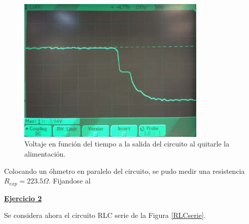 \documentclass[a4paper]{article}
\begin{document}
\begin{figure}[H]
	\centering
	\includegraphics[width=0.8\textwidth]{Descarga-transitoria.jpeg}
	\caption{Voltaje en función del tiempo a la salida del circuito al quitarle la alimentación.}
\end{figure}






Colocando un óhmetro en paralelo del circuito, se pudo medir una resistencia $R_{exp}=223.5\Omega$.
Fijandose al







\newpage

\textbf{\underline{Ejercicio 2}}

\vspace{1em}

Se considera ahora el circuito RLC serie de la Figura \ref{RLCserie}.
\end{document}
